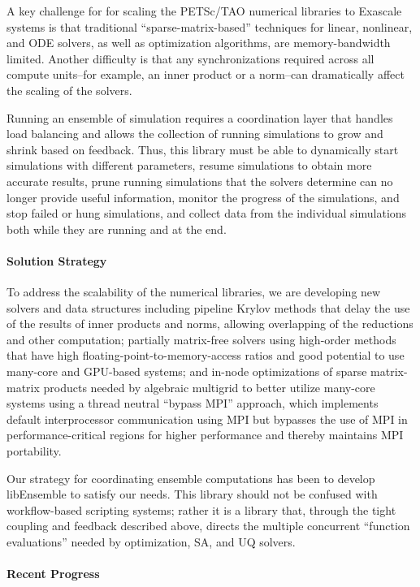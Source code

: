 A key challenge for for scaling the PETSc/TAO numerical libraries to Exascale systems is that 
traditional ``sparse-matrix-based'' techniques for linear, nonlinear, and ODE solvers, as well 
as optimization algorithms, are memory-bandwidth limited.  Another difficulty is that any 
synchronizations required across all compute units--for example, an inner product or a 
norm--can dramatically affect the scaling of the solvers.

Running an ensemble of simulation requires a coordination layer that handles load balancing and
allows the collection of running simulations to grow and shrink based on feedback. Thus, this 
library must be able to dynamically start simulations with different parameters, resume 
simulations to obtain more accurate results, prune running simulations that the solvers 
determine can no longer provide useful information, monitor the progress of the simulations, 
and stop failed or hung simulations, and collect data from the individual simulations both 
while they are running and at the end.

\paragraph{Solution Strategy}

To address the scalability of the numerical libraries, we are developing new solvers and data 
structures including pipeline Krylov methods that delay the use of the results of inner products 
and norms, allowing overlapping of the reductions and other computation; partially matrix-free 
solvers using high-order methods that have high floating-point-to-memory-access ratios and
good potential to use many-core and GPU-based systems; and in-node optimizations of sparse 
matrix-matrix products needed by algebraic multigrid to better utilize many-core systems
using a thread neutral ``bypass MPI'' approach, which implements default interprocessor 
communication using MPI but bypasses the use of MPI in performance-critical regions 
for higher performance and thereby maintains MPI portability.

Our strategy for coordinating ensemble computations has been to develop libEnsemble
to satisfy our needs.  This library should not be confused with workflow-based 
scripting systems; rather it is a library that, through the tight coupling and 
feedback described above, directs the multiple concurrent ``function evaluations''
needed by optimization, SA, and UQ solvers.

\paragraph{Recent Progress}

